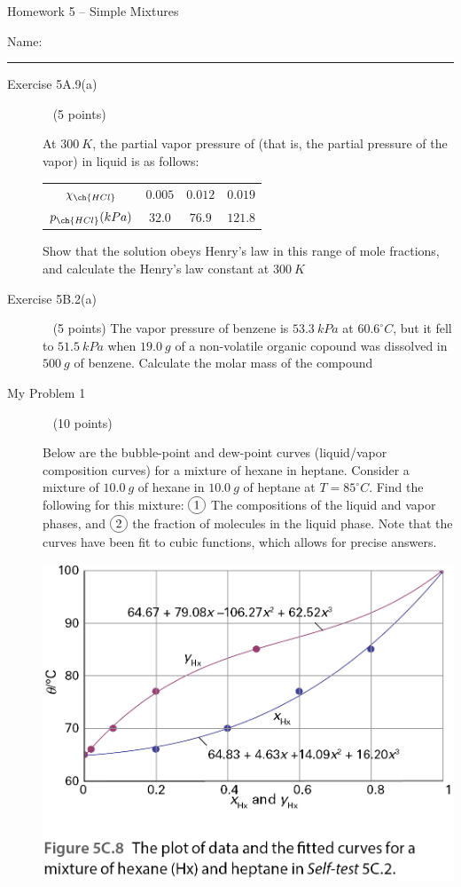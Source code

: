 \documentclass[12pt, openany, letterpaper]{memoir}
\begin{document}
\begin{center}
	{\large Homework 5 -- Simple Mixtures}
\end{center}

Name: \rule[-.1mm]{15em}{0.1pt}

\begin{description}
	\item [Exercise 5A.9(a)] ~ (5 points)

	      At $300~K$, the partial vapor pressure of  (that is, the partial pressure of the  vapor) in liquid  is as follows:

	      \begin{tabular}{c|c|c|c}
		      $\chi_{\ch{HCl}}$   & $0.005$ & $0.012$ & $0.019$ \\
		      $p_{\ch{HCl}}(kPa)$ & $32.0$  & $76.9$  & $121.8$
	      \end{tabular}

	      Show that the solution obeys Henry's law in this range of mole fractions, and calculate the Henry's law constant at $300~K$

	      \vspace{15em}
	\item [Exercise 5B.2(a)] ~ (5 points)
	      The vapor pressure of benzene is $53.3~kPa$ at $60.6^\circ C$, but it fell to $51.5~kPa$ when $19.0~g$ of a non-volatile organic copound was dissolved in $500~g$ of benzene. Calculate the molar mass of the compound


	      \vspace{20em}
	\item [My Problem 1] ~ (10 points)

	      Below are the bubble-point and dew-point curves (liquid/vapor composition curves) for a mixture of hexane in heptane. Consider a mixture of $10.0~g$ of hexane in $10.0~g$ of heptane at $T=85^\circ C$. Find the following for this mixture: $\circled{1}$ The compositions of the liquid and vapor phases, and $\circled{2}$ the fraction of molecules in the liquid phase. Note that the curves have been fit to cubic functions, which allows for precise answers.

	      \noindent\includegraphics[width=0.5\linewidth]{Mixture_Curve}


\end{description}
\end{document}
